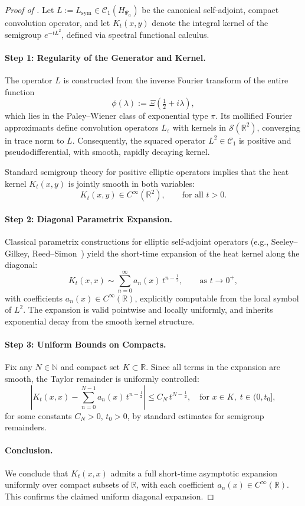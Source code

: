 \begin{proof}[Proof of ]
Let \( L := L_{\mathrm{sym}} \in \mathcal{C}_1(H_{\Psi_\alpha}) \) be the canonical self-adjoint, compact convolution operator, and let \( K_t(x,y) \) denote the integral kernel of the semigroup \( e^{-tL^2} \), defined via spectral functional calculus.

\paragraph{Step 1: Regularity of the Generator and Kernel.}
The operator \( L \) is constructed from the inverse Fourier transform of the entire function
\[
\phi(\lambda) := \Xi\left(\tfrac{1}{2} + i\lambda\right),
\]
which lies in the Paley--Wiener class of exponential type \( \pi \). Its mollified Fourier approximants define convolution operators \( L_\varepsilon \) with kernels in \( \mathcal{S}(\mathbb{R}^2) \), converging in trace norm to \( L \). Consequently, the squared operator \( L^2 \in \mathcal{C}_1 \) is positive and pseudodifferential, with smooth, rapidly decaying kernel.

Standard semigroup theory for positive elliptic operators implies that the heat kernel \( K_t(x,y) \) is jointly smooth in both variables:
\[
K_t(x,y) \in C^\infty(\mathbb{R}^2), \qquad \text{for all } t > 0.
\]

\paragraph{Step 2: Diagonal Parametrix Expansion.}
Classical parametrix constructions for elliptic self-adjoint operators (e.g., Seeley–Gilkey, Reed–Simon~\cite{ReedSimon1978IV}) yield the short-time expansion of the heat kernel along the diagonal:
\[
K_t(x,x) \sim \sum_{n=0}^\infty a_n(x) \, t^{n - \frac{1}{2}}, \qquad \text{as } t \to 0^+,
\]
with coefficients \( a_n(x) \in C^\infty(\mathbb{R}) \), explicitly computable from the local symbol of \( L^2 \). The expansion is valid pointwise and locally uniformly, and inherits exponential decay from the smooth kernel structure.

\paragraph{Step 3: Uniform Bounds on Compacts.}
Fix any \( N \in \mathbb{N} \) and compact set \( K \subset \mathbb{R} \). Since all terms in the expansion are smooth, the Taylor remainder is uniformly controlled:
\[
\left| K_t(x,x) - \sum_{n=0}^{N-1} a_n(x)\, t^{n - \frac{1}{2}} \right| \le C_N\, t^{N - \frac{1}{2}}, \quad \text{for } x \in K, \; t \in (0, t_0],
\]
for some constants \( C_N > 0 \), \( t_0 > 0 \), by standard estimates for semigroup remainders.

\paragraph{Conclusion.}
We conclude that \( K_t(x,x) \) admits a full short-time asymptotic expansion uniformly over compact subsets of \( \mathbb{R} \), with each coefficient \( a_n(x) \in C^\infty(\mathbb{R}) \). This confirms the claimed uniform diagonal expansion.
\end{proof}
